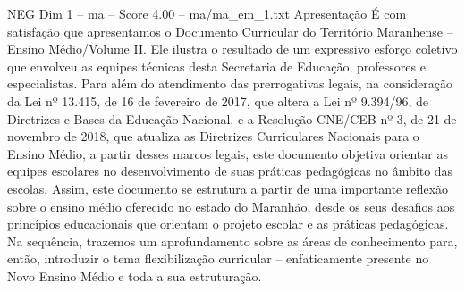 \begin{textsample}{NEG Dim 1 – ma – Score 4.00 – ma/ma\_em\_1.txt}  \label{ex:f1_neg_224}
Apresentação É com satisfação que apresentamos o Documento Curricular do Território Maranhense – Ensino Médio/Volume II.
Ele ilustra o resultado de um expressivo esforço coletivo que envolveu as equipes técnicas desta Secretaria de Educação, professores e especialistas.
Para além do atendimento das prerrogativas legais, na consideração da Lei nº 13.415, de 16 de fevereiro de 2017, que altera a Lei nº 9.394/96, de Diretrizes e Bases da Educação Nacional, e a Resolução CNE/CEB nº 3, de 21 de novembro de 2018, que atualiza as Diretrizes Curriculares Nacionais para o Ensino Médio, a partir desses marcos legais, este documento objetiva orientar as equipes escolares no desenvolvimento de suas práticas pedagógicas no âmbito das escolas.
Assim, este documento se estrutura a partir de uma importante reflexão sobre o ensino médio oferecido no estado do Maranhão, desde os seus desafios aos princípios educacionais que orientam o projeto escolar e as práticas pedagógicas.
Na sequência, trazemos um aprofundamento sobre as áreas de conhecimento para, então, introduzir o tema flexibilização curricular – enfaticamente presente no Novo Ensino Médio e toda a sua estruturação.

\end{textsample}
